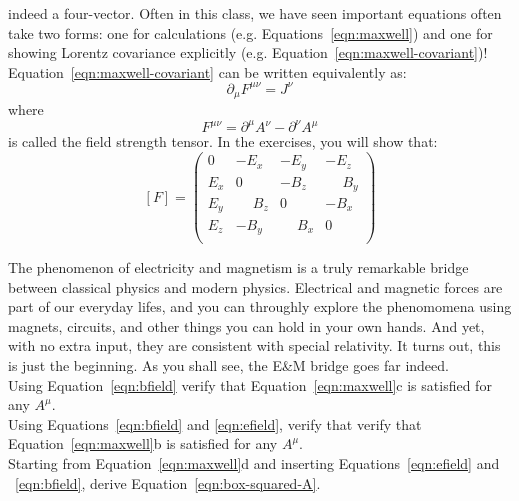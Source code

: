 \documentclass[12pt]{article}
\begin{document}
indeed a four-vector.  Often in this class, we have seen important
equations often take two forms: one for calculations
(e.g. Equations~\ref{eqn:maxwell}) and one for showing Lorentz
covariance explicitly (e.g. Equation~\ref{eqn:maxwell-covariant})!
Equation~\ref{eqn:maxwell-covariant} can be written equivalently as:
\begin{equation*}
\partial_\mu F^{\mu\nu} = J^\nu
\end{equation*}
where
\begin{equation}
F^{\mu\nu} = \partial^\mu A^\nu - \partial^\nu A^\mu
\end{equation}
is called the field strength tensor.  In the exercises, you will show that:
\begin{equation}
\label{eqn:field-strength-matrix}
  [F] = \begin{pmatrix}
    0 & -E_x & -E_y & -E_z \\
  E_x &  0   & -B_z & \phantom{-}B_y \\
  E_y &  \phantom{-}B_z &  0   & -B_x \\
  E_z & -B_y &  \phantom{-}B_x &  0   \\
  \end{pmatrix}
\end{equation}



The phenomenon of electricity and magnetism is a truly remarkable
bridge between classical physics and modern physics.  Electrical and
magnetic forces are part of our everyday lifes, and you can throughly
explore the phenomomena using magnets, circuits, and other things you
can hold in your own hands.  And yet, with no extra input, they are
consistent with special relativity.  It turns out, this is just the
beginning.  As you shall see, the E\&M bridge goes far indeed.\\[5pt]

\exercise Using Equation~\ref{eqn:bfield} verify that
Equation~\ref{eqn:maxwell}c is satisfied for any $A^\mu$.\\[5pt]

\exercise Using Equations~\ref{eqn:bfield} and \ref{eqn:efield},
verify that verify that Equation~\ref{eqn:maxwell}b is satisfied for
any $A^\mu$.\\[5pt]

\exercise Starting from Equation~\ref{eqn:maxwell}d and inserting
Equations~\ref{eqn:efield} and ~\ref{eqn:bfield}, derive Equation~\ref{eqn:box-squared-A}.\\[5pt]
\end{document}
